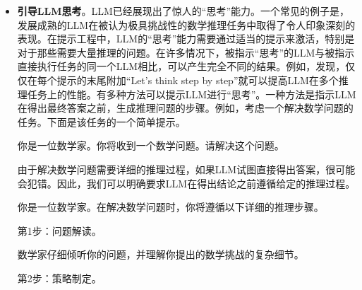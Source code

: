 \begin{itemize}
\begin{tcolorbox}
    \end{tcolorbox}
    \vspace{0.5em}

\item \vspace{0.3em} \textbf{引导LLM思考}。LLM已经展现出了惊人的“思考”能力。一个常见的例子是，发展成熟的LLM在被认为极具挑战性的数学推理任务中取得了令人印象深刻的表现。在提示工程中，LLM的“思考”能力需要通过适当的提示来激活，特别是对于那些需要大量推理的问题。在许多情况下，被指示“思考”的LLM与被指示直接执行任务的同一个LLM相比，可以产生完全不同的结果。例如，\citet{kojima-etal:2022large}发现，仅仅在每个提示的末尾附加“Let's think step by step”就可以提高LLM在多个推理任务上的性能。有多种方法可以提示LLM进行“思考”。一种方法是指示LLM在得出最终答案之前，生成推理问题的步骤。例如，考虑一个解决数学问题的任务。下面是该任务的一个简单提示。

    \vspace{0.5em}
    \begin{tcolorbox}

    \begingroup
    \setlength{\leftskip}{2em}
    \setlength{\rightskip}{2em}

    你是一位数学家。你将收到一个数学问题。请解决这个问题。

    \underline{\hspace{2em}}

    \endgroup

    \end{tcolorbox}
    \vspace{0.5em}

    由于解决数学问题需要详细的推理过程，如果LLM试图直接得出答案，很可能会犯错。因此，我们可以明确要求LLM在得出结论之前遵循给定的推理过程。

    \vspace{0.5em}
    \begin{tcolorbox}

    \begingroup
    \setlength{\leftskip}{2em}
    \setlength{\rightskip}{2em}

    你是一位数学家。在解决数学问题时，你将遵循以下详细的推理步骤。

    \vspace{0.5em}

    第1步：问题解读。

    数学家仔细倾听你的问题，并理解你提出的数学挑战的复杂细节。

    \vspace{0.5em}

    第2步：策略制定。


\end{tcolorbox}
\end{itemize}
